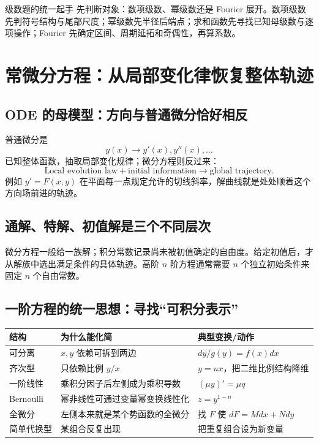 \documentclass[11pt,a4paper,openany]{ctexbook}
\begin{document}
\begin{examBox}{级数题的统一起手}
先判断对象：数项级数、幂级数还是 Fourier 展开。数项级数先判符号结构与尾部尺度；幂级数先半径后端点；求和函数先寻找已知母级数与逐项操作；Fourier 先确定区间、周期延拓和奇偶性，再算系数。
\end{examBox}

\chapter{常微分方程：从局部变化律恢复整体轨迹}

\section{ODE 的母模型：方向与普通微分恰好相反}
普通微分是
\[
y(x)\longrightarrow y'(x),y''(x),\dots
\]
已知整体函数，抽取局部变化规律；微分方程则反过来：
\[
\boxed{\text{Local evolution law}+\text{initial information}\to\text{global trajectory}}.
\]
例如 $y'=F(x,y)$ 在平面每一点规定允许的切线斜率，解曲线就是处处顺着这个方向场前进的轨迹。

\section{通解、特解、初值解是三个不同层次}
微分方程一般给一族解；积分常数记录尚未被初值确定的自由度。给定初值后，才从解族中选出满足条件的具体轨迹。高阶 $n$ 阶方程通常需要 $n$ 个独立初始条件来固定 $n$ 个自由常数。

\section{一阶方程的统一思想：寻找“可积分表示”}
\begin{longtable}{L{3.1cm}L{5.1cm}L{\dimexpr\linewidth-8.37cm\relax}}
\toprule
\textbf{结构} & \textbf{为什么能化简} & \textbf{典型变换/动作}\\
\midrule
可分离 & $x,y$ 依赖可拆到两边 & $dy/g(y)=f(x)dx$\\
齐次型 & 只依赖比例 $y/x$ & $y=ux$，把二维比例结构降维\\
一阶线性 & 乘积分因子后左侧成为乘积导数 & $(\mu y)'=\mu q$\\
Bernoulli & 幂非线性可通过变量幂变换线性化 & $z=y^{1-n}$\\
全微分 & 左侧本来就是某个势函数的全微分 & 找 $F$ 使 $dF=Mdx+Ndy$\\
简单代换型 & 某组合反复出现 & 把重复组合设为新变量\\
\bottomrule
\end{longtable}
\end{document}

